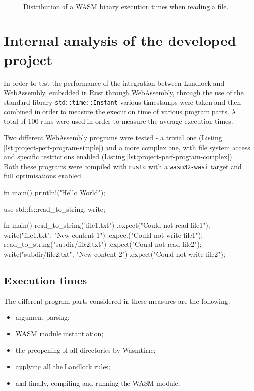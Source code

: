 \begin{figure}[ht!]
  \caption{Distribution of a WASM binary execution times when reading a file.}
  \label{fig:distribution-reading-wasm}
\end{figure}

\section{Internal analysis of the developed project}

In order to test the performance of the integration between Landlock and WebAssembly,
embedded in Rust through WebAssembly, through the use of the standard library \texttt{std::time::Instant}
various timestamps were taken and then combined in order to measure the execution time of various program parts.
A total of 100 runs were used in order to measure the average execution times.

Two different WebAssembly programs were tested - a trivial one
(Listing \ref{lst:project-perf-program-simple}) and a more complex one, with
file system access and specific restrictions enabled (Listing \ref{lst:project-perf-program-complex}).
Both these programs were compiled with \texttt{rustc} with a \texttt{wasm32-wasi} target and full
optimisations enabled.

\vspace*{0.5cm}

\begin{code}[language=Rust, caption=The tested trivial program, label=lst:project-perf-program-simple]
  fn main() {
    println!("Hello World");
  }
\end{code}

\clearpage
\begin{code}[language=Rust, caption=The more complex tested program, label=lst:project-perf-program-complex]
use std::fs::{read_to_string, write};

fn main() {
  read_to_string("file1.txt")
    .expect("Could not read file1");
  write("file1.txt", "New content 1")
    .expect("Could not write file1");
  read_to_string("subdir/file2.txt")
    .expect("Could not read file2");
  write("subdir/file2.txt", "New content 2")
    .expect("Could not write file2");
}  
\end{code}

\subsection{Execution times}

The different program parts considered in these measures are the following:
\begin{itemize}
  \item argument parsing;
  \item WASM module instantiation;
  \item the preopening of all directories by Wasmtime;
  \item applying all the Landlock rules;
  \item and finally, compiling and running the WASM module.
\end{itemize}

